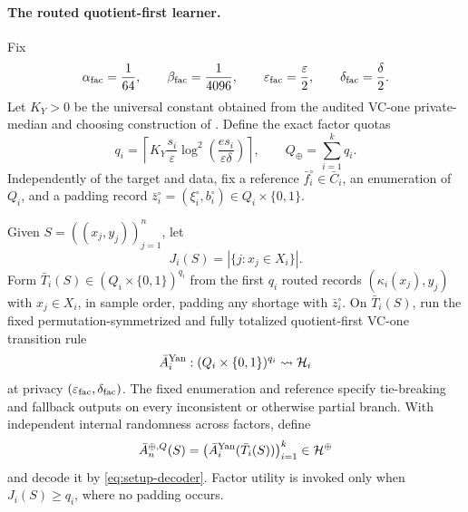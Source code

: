 \paragraph{The routed quotient-first learner.}
Fix
\[
\alpha_{\rm fac}=\frac1{64},
\qquad
\beta_{\rm fac}=\frac1{4096},
\qquad
\varepsilon_{\rm fac}=\frac\varepsilon2,
\qquad
\delta_{\rm fac}=\frac\delta2.
\]
Let \(K_Y>0\) be the universal constant obtained from the audited
VC-one private-median and choosing construction of
\citet{yan2025vc1}.  Define the exact factor quotas
\begin{equation}\label{eq:prelim-quotas}
q_i=\left\lceil
K_Y\frac{s_i}{\varepsilon}
\log^2\!\left(\frac{e s_i}{\varepsilon\delta}\right)
\right\rceil,
\qquad
Q_\oplus=\sum_{i=1}^kq_i.
\end{equation}
Independently of the target and data, fix a reference
\(\bar f_i^\circ\in\bar C_i\), an enumeration of \(Q_i\), and a padding
record
\(\bar z_i^\circ=(\xi_i^\circ,b_i^\circ)\in Q_i\times\{0,1\}\).

Given \(S=((x_j,y_j))_{j=1}^n\), let
\[
J_i(S)=|\{j:x_j\in X_i\}|.
\]
Form
\(\bar T_i(S)\in(Q_i\times\{0,1\})^{q_i}\) from the first \(q_i\)
routed records \((\kappa_i(x_j),y_j)\) with \(x_j\in X_i\), in sample
order, padding any shortage with \(\bar z_i^\circ\).  On
\(\bar T_i(S)\), run the fixed permutation-symmetrized and fully
totalized quotient-first VC-one transition rule
\[
\bar A_i^{\rm Yan}:
(Q_i\times\{0,1\})^{q_i}\rightsquigarrow\mathcal H_i
\]
at privacy
\((\varepsilon_{\rm fac},\delta_{\rm fac})\).  The fixed enumeration
and reference specify tie-breaking and fallback outputs on every
inconsistent or otherwise partial branch.  With independent internal
randomness across factors, define
\begin{equation}\label{eq:prelim-routed-kernel}
\bar A_n^{\oplus,Q}(S)
=\bigl(\bar A_i^{\rm Yan}(\bar T_i(S))\bigr)_{i=1}^k
\in\mathcal H^\oplus
\end{equation}
and decode it by \eqref{eq:setup-decoder}.  Factor utility is invoked
only when \(J_i(S)\ge q_i\), where no padding occurs.
